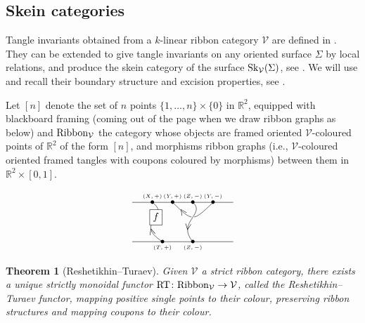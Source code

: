 \documentclass[pdftex]{sigma}%
\numberwithin{equation}{section}
\newtheorem{Theorem}{Theorem}[section]
\begin{document}
\subsection{Skein categories}\label{SectSkCat}
Tangle invariants obtained from a $k$-linear ribbon category $\mathcal{V}$ are defined in \cite[Section~I.2]{Turaev}. They can be extended to give tangle invariants on any oriented surface $\Sigma$ by local relations, and produce the skein category of the surface ${\rm Sk}_\mathcal{V}(\Sigma)$, see \cite{Walker}. We will use and recall their boundary structure and excision properties, see \cite{Cooke}.

\begin{Definition}
Let $[n]$ denote the set of $n$ points $\{1,\ldots,n\} \times \{0\}$ in $\mathbb{R}^2$, equipped with blackboard framing (coming out of the page when we draw ribbon graphs as below) and ${\rm Ribbon}_\mathcal{V}$ the category whose objects are framed oriented $\mathcal{V}$-coloured points of $\mathbb{R}^2$ of the form $[n]$, and morphisms ribbon graphs (i.e., $\mathcal{V}$-coloured oriented framed tangles with coupons coloured by morphisms) between them in $\mathbb{R}^2\times[0,1]$.
\end{Definition}
$$
\begin{tikzpicture}[baseline = 15pt, yscale = 0.7, xscale = 1.2]
\draw (0,2) -- (3,2) node[pos = 0.2]{\small $\bullet$} node[pos = 0.2, above]{\tiny $(X,+)$} node[pos = 0.4]{\small $\bullet$} node[pos = 0.4, above]{\tiny $(Y,+)$} node[pos = 0.6]{\small $\bullet$} node[pos = 0.6, above]{\tiny $(Z,-)$} node[pos = 0.8]{\small $\bullet$} node[pos = 0.8, above]{\tiny $(Y,-)$};
\draw (0,0) -- (3,0) node[pos = 0.3]{\small $\bullet$} node[pos = 0.3, below]{\tiny $(T,+)$} node[pos = 0.6]{\small $\bullet$} node[pos = 0.6, below]{\tiny $(Z,-)$};
\draw (0.9,0) .. controls (0,1) and (1.2,1.2) .. (0.6,2) node[pos=0.2, sloped]{$<$} node [pos = 0.6, rectangle, draw, fill=white]{$f$};
\draw (1.2,2) .. controls (1.8,1) .. (2.4,2) node[fill, color= white, midway, circle, scale = 0.3]{} node[pos = 0.2, sloped]{$<$};
\draw (1.8,0) .. controls (1.3,1) and (2.2,1.4) .. (1.8,2) node[pos = 0.3, sloped]{$<$};
\end{tikzpicture}
$$

\begin{Theorem}[Reshetikhin--Turaev]\label{thmturaev} Given $\mathcal{V}$ a strict ribbon category, there exists a unique strictly monoidal functor ${\rm RT}\colon {\rm Ribbon}_\mathcal{V} \to \mathcal{V}$, called the Reshetikhin--Turaev functor, mapping positive single points to their colour, preserving ribbon structures and mapping coupons to their colour.
\end{Theorem}
\end{document}
